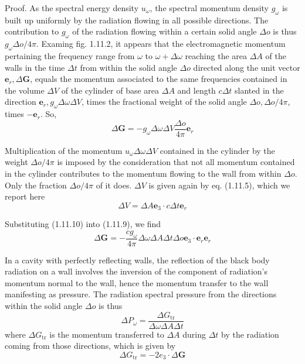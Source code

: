 \documentclass{article}
\begin{document}
Proof. As the spectral energy density $u_{\omega}$, the spectral momentum density $g_{\omega}$ is built up uniformly by the radiation flowing in all possible directions. The contribution to $g_{\omega}$ of the radiation flowing within a certain solid angle $\Delta o$ is thus $g_{\omega} \Delta o / 4 \pi$. Examing fig. 1.11.2, it appears that the electromagnetic momentum pertaining the frequency range from $\omega$ to $\omega+\Delta \omega$ reaching the area $\Delta A$ of the walls in the time $\Delta t$ from within the solid angle $\Delta o$ directed along the unit vector $\boldsymbol{e}_{r}, \Delta \boldsymbol{G}$, equals the momentum associated to the same frequencies contained in the volume $\Delta V$ of the cylinder of base area $\Delta A$ and length $c \Delta t$ slanted in the direction $\boldsymbol{e}_{r}, g_{\omega} \Delta \omega \Delta V$, times the fractional weight of the solid angle $\Delta o, \Delta o / 4 \pi$, times $-\boldsymbol{e}_{r}$. So,
$$
\begin{equation*}
\Delta \boldsymbol{G}=-g_{\omega} \Delta \omega \Delta V \frac{\Delta o}{4 \pi} \boldsymbol{e}_{r} \tag{1.11.9}
\end{equation*}
$$

Multiplication of the momentum $u_{\omega} \Delta \omega \Delta V$ contained in the cylinder by the weight $\Delta o / 4 \pi$ is imposed by the consideration that not all momentum contained in the cylinder contributes to the momentum flowing to the wall from within $\Delta o$. Only the fraction $\Delta o / 4 \pi$ of it does. $\Delta V$ is given again by eq. (1.11.5), which we report here
$$
\begin{equation*}
\Delta V=\Delta A \boldsymbol{e}_{3} \cdot c \Delta t \boldsymbol{e}_{r} \tag{1.11.10}
\end{equation*}
$$

Substituting (1.11.10) into (1.11.9), we find
$$
\begin{equation*}
\Delta \boldsymbol{G}=-\frac{c g_{\omega}}{4 \pi} \Delta \omega \Delta A \Delta t \Delta o \boldsymbol{e}_{3} \cdot \boldsymbol{e}_{r} \boldsymbol{e}_{r} \tag{1.11.11}
\end{equation*}
$$

In a cavity with perfectly reflecting walls, the reflection of the black body radiation on a wall involves the inversion of the component of radiation's momentum normal to the wall, hence the momentum transfer to the wall manifesting as pressure. The radiation spectral pressure from the directions within the solid angle $\Delta o$ is thus
$$
\begin{equation*}
\Delta P_{\omega}=\frac{\Delta G_{\mathrm{tr}}}{\Delta \omega \Delta A \Delta t} \tag{1.11.12}
\end{equation*}
$$
where $\Delta G_{\mathrm{tr}}$ is the momentum transferred to $\Delta A$ during $\Delta t$ by the radiation coming from those directions, which is given by
$$
\begin{equation*}
\Delta G_{\mathrm{tr}}=-2 e_{3} \cdot \Delta \boldsymbol{G} \tag{1.11.13}
\end{equation*}
$$
\end{document}
